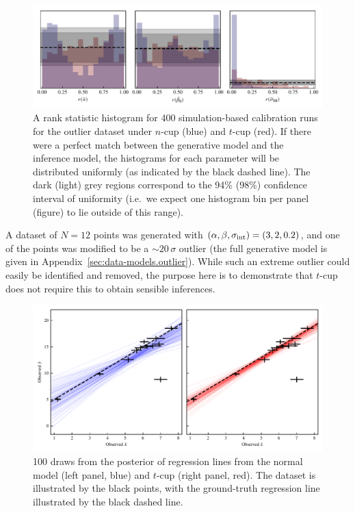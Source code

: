 \documentclass[fleqn,usenatbib]{rasti}
\begin{document}
\begin{figure}
    \includegraphics[width=\textwidth]{graphics/sbc/outlier20_sbc.pdf}
    \caption{A rank statistic histogram for 400 simulation-based calibration
    runs for the outlier dataset under $n$-cup (blue) and $t$-cup (red). If
    there were a perfect match between the generative model and the inference
    model, the histograms for each parameter will be distributed uniformly (as
    indicated by the black dashed line). The dark (light) grey regions
    correspond to the 94\% (98\%) confidence interval of uniformity (i.e.\ we
    expect one histogram bin per panel (figure) to lie outside of this range).}
    \label{fig:results.outlier.sbc}
\end{figure}

A dataset of $N = 12$ points was generated with $(\alpha, \beta, \sigma_{\rm
int}) = (3, 2, 0.2)$, and one of the points was modified to be a
$\sim20\,\sigma$ outlier (the full generative model is given in
Appendix~\ref{sec:data-models.outlier}). While such an extreme outlier could
easily be identified and removed, the purpose here is to demonstrate that
$t$-cup does not require this to obtain sensible inferences.

\begin{figure}
    \includegraphics[width=\linewidth]{graphics/fixed/regression_outlier.pdf}
    \caption{100 draws from the posterior of regression lines from
    the normal model (left panel, blue) and $t$-cup (right panel, red). The
    dataset is illustrated by the black points, with the ground-truth regression
    line illustrated by the black dashed line.}
    \label{fig:results.outlier.regression}
\end{figure}
\end{document}
